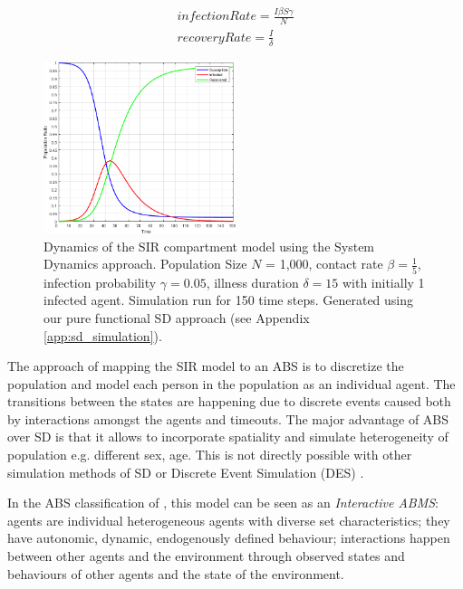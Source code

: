 \begin{equation}
\begin{aligned}
infectionRate = \frac{I \beta S \gamma}{N} \\
recoveryRate = \frac{I}{\delta} 
\end{aligned}
\end{equation}

\begin{figure}
	\centering
	\includegraphics[width=0.5\textwidth, angle=0]{./fig/timedriven/SIR_SD_1000agents_150t_001dt.png}
	\caption{Dynamics of the SIR compartment model using the System Dynamics approach. Population Size $N$ = 1,000, contact rate $\beta =  \frac{1}{5}$, infection probability $\gamma = 0.05$, illness duration $\delta = 15$ with initially 1 infected agent. Simulation run for 150 time steps. Generated using our pure functional SD approach (see Appendix \ref{app:sd_simulation}).}
	\label{fig:sir_sd_dynamics}
\end{figure}

The approach of mapping the SIR model to an ABS is to discretize the population and model each person in the population as an individual agent. The transitions between the states are happening due to discrete events caused both by interactions amongst the agents and timeouts. The major advantage of ABS over SD is that it allows to incorporate spatiality and simulate heterogeneity of population e.g. different sex, age. This is not directly possible with other simulation methods of SD or Discrete Event Simulation (DES) \cite{zeigler_theory_2000}.

In the ABS classification of \cite{macal_everything_2016}, this model can be seen as an \textit{Interactive ABMS}: agents are individual heterogeneous agents with diverse set characteristics; they have autonomic, dynamic, endogenously defined behaviour; interactions happen between other agents and the environment through observed states and behaviours of other agents and the state of the environment.